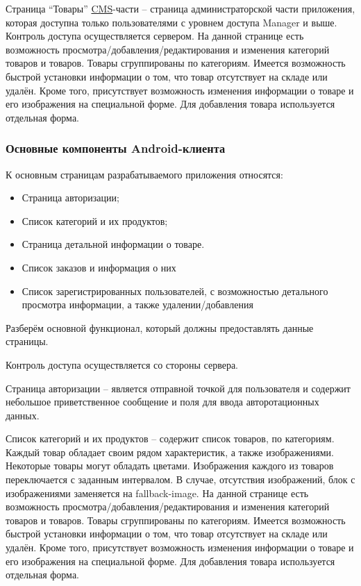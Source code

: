 Страница “Товары” \hyperlink{gloss:cms}{CMS}-части – страница администраторской части приложения, которая доступна только пользователями с уровнем доступа Manager и выше.
Контроль доступа осуществляется сервером.
На данной странице есть возможность просмотра/добавления/редактирования и изменения категорий товаров и товаров.
Товары сгруппированы по категориям.
Имеется возможность быстрой установки информации о том, что товар отсутствует на складе или удалён.
Кроме того, присутствует возможность изменения информации о товаре и его изображения на специальной форме.
Для добавления товара используется отдельная форма.


\subsubsection{Основные компоненты Android-клиента}

К основным страницам разрабатываемого приложения относятся:

\begin{itemize}
    \item Страница авторизации;
    \item Список категорий и их продуктов;
    \item Страница детальной информации о товаре.
    \item Список заказов и информация о них
    \item Список зарегистрированных пользователей, с возможностью детального просмотра информации, а также удалении/добавления
\end{itemize}

Разберём основной функционал, который должны предоставлять данные страницы.

Контроль доступа осуществляется со стороны сервера.

Страница авторизации – является отправной точкой для пользователя и содержит небольшое приветственное сообщение и поля для ввода авторотационных данных.

Список категорий и их продуктов – содержит список товаров, по категориям.
Каждый товар обладает своим рядом характеристик, а также изображениями.
Некоторые товары могут обладать цветами.
Изображения каждого из товаров переключается с заданным интервалом.
В случае, отсутствия изображений, блок с изображениями заменяется на fallback-image.
На данной странице есть возможность просмотра/добавления/редактирования и изменения категорий товаров и товаров.
Товары сгруппированы по категориям.
Имеется возможность быстрой установки информации о том, что товар отсутствует на складе или удалён.
Кроме того, присутствует возможность изменения информации о товаре и его изображения на специальной форме.
Для добавления товара используется отдельная форма.
